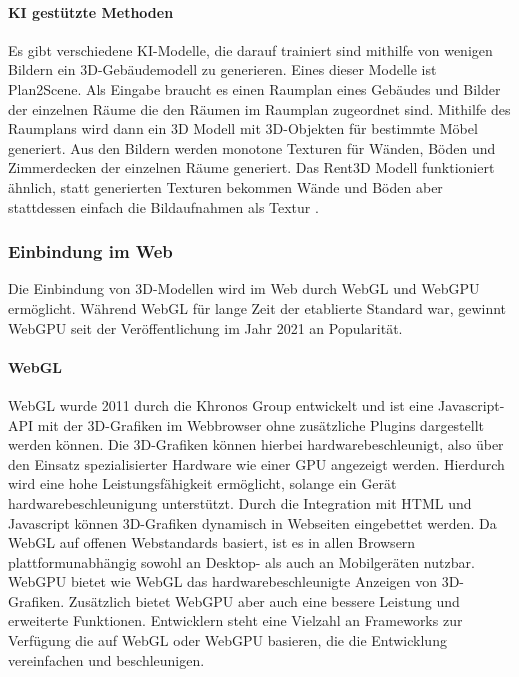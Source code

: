 \paragraph{KI gestützte Methoden}
Es gibt verschiedene KI-Modelle, die darauf trainiert sind mithilfe von wenigen Bildern ein 3D-Gebäudemodell zu generieren. Eines dieser Modelle ist Plan2Scene. Als Eingabe braucht es einen Raumplan eines Gebäudes und Bilder der einzelnen Räume die den Räumen im Raumplan zugeordnet sind. Mithilfe des Raumplans wird dann ein 3D Modell mit 3D-Objekten für bestimmte Möbel generiert. Aus den Bildern werden monotone Texturen für Wänden, Böden und Zimmerdecken der einzelnen Räume generiert.\cite[S.~10733]{Plan2Scene2021} Das Rent3D Modell funktioniert ähnlich, statt generierten Texturen bekommen Wände und Böden aber stattdessen einfach die Bildaufnahmen als Textur \cite[S.~3413]{Rent3D2015}.

\subsubsection{Einbindung im Web}
Die Einbindung von 3D-Modellen wird im Web durch \ac{WebGL} und WebGPU ermöglicht. Während \ac{WebGL} für lange Zeit der etablierte Standard war, gewinnt WebGPU seit der Veröffentlichung im Jahr 2021 an Popularität.

\paragraph{WebGL}
\ac{WebGL} wurde 2011 durch die Khronos Group entwickelt und ist eine Javascript-API mit der 3D-Grafiken im Webbrowser ohne zusätzliche Plugins dargestellt werden können. Die 3D-Grafiken können hierbei hardwarebeschleunigt, also über den Einsatz spezialisierter Hardware wie einer \ac{GPU} angezeigt werden. Hierdurch wird eine hohe Leistungsfähigkeit ermöglicht, solange ein Gerät hardwarebeschleunigung unterstützt. Durch die Integration mit HTML und Javascript können 3D-Grafiken dynamisch in Webseiten eingebettet werden. Da \ac{WebGL} auf offenen Webstandards basiert, ist es in allen Browsern plattformunabhängig sowohl an Desktop- als auch an Mobilgeräten nutzbar.\cite[S.~17-19]{Parisi2014} WebGPU bietet wie WebGL das hardwarebeschleunigte Anzeigen von 3D-Grafiken. Zusätzlich bietet WebGPU aber auch eine bessere Leistung und erweiterte Funktionen.\cite{WebGPU} Entwicklern steht eine Vielzahl an Frameworks zur Verfügung die auf \ac{WebGL} oder WebGPU basieren, die die Entwicklung vereinfachen und beschleunigen.\cite{Seguin2024}

